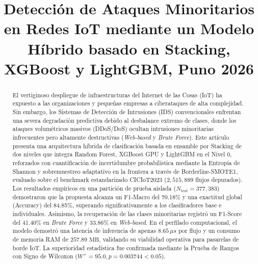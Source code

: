\documentclass[conference]{IEEEtran}
\begin{document}
\title{Detección de Ataques Minoritarios en Redes IoT mediante un Modelo Híbrido basado en Stacking, XGBoost y LightGBM, Puno 2026}

\author{
}

\maketitle

\begin{abstract}
El vertiginoso despliegue de infraestructuras del Internet de las Cosas (IoT) ha expuesto a las organizaciones y pequeñas empresas a ciberataques de alta complejidad. Sin embargo, los Sistemas de Detección de Intrusiones (IDS) convencionales enfrentan una severa degradación predictiva debido al desbalance extremo de clases, donde los ataques volumétricos masivos (DDoS/DoS) ocultan intrusiones minoritarias infrecuentes pero altamente destructivas (\textit{Web-based} y \textit{Brute Force}). Este artículo presenta una arquitectura híbrida de clasificación basada en ensamble por Stacking de dos niveles que integra Random Forest, XGBoost GPU y LightGBM en el Nivel 0, reforzados con cuantificación de incertidumbre probabilística mediante la Entropía de Shannon y sobremuestreo adaptativo en la frontera a través de Borderline-SMOTE1, evaluado sobre el benchmark estandarizado CICIoT2023 ($2,515,889$ flujos depurados). Los resultados empíricos en una partición de prueba aislada ($N_{\mathrm{test}} = 377,383$) demostraron que la propuesta alcanza un F1-Macro del 70.18\% y una exactitud global (Accuracy) del 84.85\%, superando significativamente a los clasificadores base e individuales. Asimismo, la recuperación de las clases minoritarias registró un F1-Score del 41.40\% en \textit{Brute Force} y 33.86\% en \textit{Web-based}. En el perfilado computacional, el modelo demostró una latencia de inferencia de apenas $8.65\,\mu s$ por flujo y un consumo de memoria RAM de $257.89\text{ MB}$, validando su viabilidad operativa para pasarelas de borde IoT. La superioridad estadística fue confirmada mediante la Prueba de Rangos con Signo de Wilcoxon ($W^+ = 95.0, p = 0.003744 < 0.05$).
\end{abstract}
\end{document}
